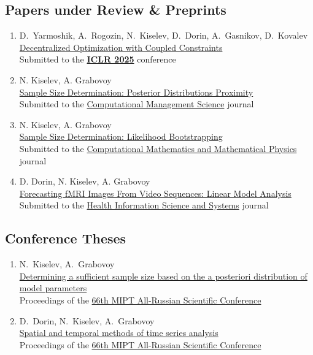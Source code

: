\documentclass[11pt,a4paper]{moderncv}
\begin{document}
\subsection{Papers under Review \& Preprints}
\begin{enumerate}
    \item D.~Yarmoshik, A.~Rogozin, N.~Kiselev, D.~Dorin, A.~Gasnikov, D.~Kovalev\\
    \href{https://arxiv.org/abs/2407.02020}{Decentralized Optimization with Coupled Constraints}\\
    Submitted to the \href{https://neurips.cc}{\textbf{ICLR 2025}} conference
    \item N. Kiselev, A. Grabovoy\\
    \href{https://github.com/kisnikser/Posterior-Distributions-Proximity}{Sample Size Determination: Posterior Distributions Proximity}\\
    Submitted to the \href{https://link.springer.com/journal/10287}{Computational Management Science} journal
    \item N. Kiselev, A. Grabovoy\\
    \href{https://github.com/kisnikser/Likelihood-Bootstrapping}{Sample Size Determination: Likelihood Bootstrapping}\\
    Submitted to the \href{https://link.springer.com/journal/11470}{Computational Mathematics and Mathematical Physics} journal
    \item D. Dorin, N. Kiselev, A. Grabovoy\\
    \href{https://github.com/DorinDaniil/Forecasting-fMRI-Images}{Forecasting fMRI Images From Video Sequences: Linear Model Analysis}\\
    Submitted to the \href{https://link.springer.com/journal/13755}{Health Information Science and Systems} journal
\end{enumerate}
\subsection{Conference Theses}
\begin{enumerate}
    \item N.~Kiselev, A.~Grabovoy\\
    \href{https://old.mipt.ru/upload/medialibrary/d79/fpmi.pdf}{Determining a sufficient sample size based on the a posteriori distribution of model parameters}\\
    Proceedings of the \href{https://conf.mipt.ru/}{66th MIPT All-Russian Scientific Conference}
    \item D.~Dorin, N.~Kiselev, A.~Grabovoy\\
    \href{https://old.mipt.ru/upload/medialibrary/d79/fpmi.pdf}{Spatial and temporal methods of time series analysis}\\
    Proceedings of the \href{https://conf.mipt.ru/}{66th MIPT All-Russian Scientific Conference}
\end{enumerate}
\end{document}
